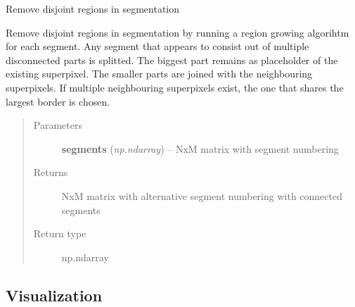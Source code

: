 \documentclass[letterpaper,10pt,english]{sphinxmanual}
\begin{document}
\begin{fulllineitems}
\label{flamingo/segmentation/index:flamingo.segmentation.postprocess.remove_disjoint}
Remove disjoint regions in segmentation

Remove disjoint regions in segmentation by running a region
growing algorihtm for each segment. Any segment that appears to
consist out of multiple disconnected parts is splitted. The
biggest part remains as placeholder of the existing superpixel.
The smaller parts are joined with the neighbouring superpixels.
If multiple neighbouring superpixels exist, the one that shares
the largest border is chosen.
\begin{quote}\begin{description}
\item[{Parameters}] \leavevmode
\textbf{segments} (\emph{np.ndarray}) -- NxM matrix with segment numbering

\item[{Returns}] \leavevmode
NxM matrix with alternative segment numbering with connected
segments

\item[{Return type}] \leavevmode
np.ndarray

\end{description}\end{quote}

\end{fulllineitems}



\subsection{Visualization}
\label{flamingo/segmentation/index:module-flamingo.segmentation.plot}\label{flamingo/segmentation/index:visualization}
\end{document}
